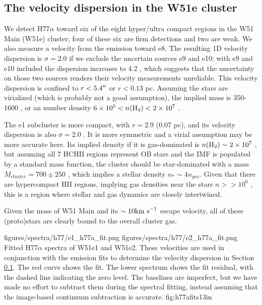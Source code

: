 \subsection{The velocity dispersion in the W51e cluster}
\label{sec:vdisp}
We detect H77$\alpha$ toward six of the eight hyper/ultra compact \hii regions
in the W51 Main (W51e) cluster; four of these six are firm detections and two
are weak.  We also measure a velocity from the \formaldehyde emission toward
e8.  The resulting 1D velocity dispersion is $\sigma=2.0$ \kms if we exclude
the uncertain sources e9
and e10; with e9 and e10 included the dispersion increases to 4.2 \kms, which
suggests that the uncertainty on those two sources renders their velocity
measurements unreliable.  This velocity dispersion is confined to
$r<5.4\mbox{$^{\prime\prime}$}$ or $r<0.13$ pc.  Assuming the stars are virialized (which is
probably not a good assumption), the implied mass is 350-1600 \msun, or an \hh
number density $6\times10^{5} < n(\textrm{H}_{2}) < 2\times10^{7}$ \percc.

The e1 subcluster is more compact, with $r=2.9$ \arcsec (0.07 pc), and its
velocity dispersion is also $\sigma=2.0$ \kms.  It is more symmetric and a virial
assumption may be more accurate here.  Its implied density if it is gas-dominated
is $n(\textrm{H}_{2})\sim2\times10^{7}$ \percc, but assuming all 7 HCHII regions represent OB
stars and the IMF is populated by a standard \citet{Kroupa2001a} mass function,
the cluster should be star-dominated with a mass $M_{cluster}=700\pm250$ \msun,
which implies a stellar density $n_* \sim 4 n_{gas}$.  Given that there are 
hypercompact HII regions, implying gas densities near the stars $n>>10^6$ \percc,
this is a region where stellar and gas dynamics are closely intertwined.

Given the mass of W51 Main and its $\sim10\textrm{km~s}^{-1}$ escape velocity, all of these
(proto)stars are clearly bound to the overall cluster gas. 

\FigureTwo
{figures/spectra/h77/e1_h77a_fit.png}
{figures/spectra/h77/e2_h77a_fit.png}
{Fitted H77$\alpha$ spectra of W51e1 and W51e2.  These velocities are used in
conjunction with the \formaldehyde emission fits to determine the velocity
dispersion in Section \ref{sec:vdisp}.
The red curve shows the fit.  The lower spectrum shows the fit residual, with
the dashed line indicating the zero level.  The baselines are imperfect, but we
have made no effort to subtract them during the spectral fitting, instead
assuming that the image-based continuum subtraction is accurate.
}
{fig:h77afits}{1}{3in}

